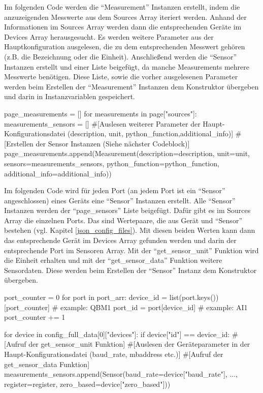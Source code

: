 Im folgenden Code werden die \enquote{Measurement} Instanzen erstellt, indem die anzuzeigenden Messwerte aus dem Sources Array iteriert werden. Anhand der Informationen im Sources Array werden dann die entsprechenden Geräte im Devices Array herausgesucht. Es werden weitere Parameter aus der Hauptkonfiguration ausgelesen, die zu dem entsprechenden Messwert gehören (z.B. die Bezeichnung oder die Einheit). Anschließend werden die \enquote{Sensor} Instanzen erstellt und einer Liste beigefügt, da manche Measurements mehrere Messwerte benötigen. Diese Liste, sowie die vorher ausgelesenen Parameter werden beim Erstellen der \enquote{Measurement} Instanzen dem Konstruktor übergeben und darin in Instanzvariablen gespeichert.
\begin{pythoncode}
page_measurements = []
for measurements in page["sources"]:
	measurements_sensors = []
	#[Auslesen weiterer Parameter der Haupt-Konfigurationsdatei (description, unit, python_function,additional_info)]
	#[Erstellen der Sensor Instanzen (Siehe nächster Codeblock)]
	page_measurements.append(Measurement(description=description, unit=unit, sensors=measurements_sensors, python_function=python_function, additional_info=additional_info))
\end{pythoncode}

Im folgenden Code wird für jeden Port (an jedem Port ist ein \enquote{Sensor} angeschlossen) eines Geräts eine \enquote{Sensor} Instanzen erstellt. Alle \enquote{Sensor} Instanzen werden der \enquote{page\_sensors} Liste beigefügt. Dafür gibt es im Sources Array die einzelnen Ports. Das sind Wertepaare, die aus Gerät und \enquote{Sensor} bestehen (vgl. Kapitel \ref{json_config_files}). Mit diesen beiden Werten kann dann das entsprechende Gerät im Devices Array gefunden werden und darin der entsprechende Port im Sensoren Array. Mit der \enquote{get\_sensor\_unit} Funktion wird die Einheit erhalten und mit der \enquote{get\_sensor\_data} Funktion weitere Sensordaten. Diese werden beim Erstellen der \enquote{Sensor} Instanz dem Konstruktor übergeben.
\begin{pythoncode}
port_counter = 0
for port in port_arr:
	device_id = list(port.keys())[port_counter] # example: QBM1
	port_id = port[device_id]  # example: AI1
	port_counter += 1
	
	for device in config_full_data[0]["devices"]:
		if device["id"] == device_id:
			#[Aufruf der get_sensor_unit Funktion]
			#[Auslesen der Geräteparameter in der Haupt-Konfigurationsdatei (baud_rate, mbaddress etc.)]
			#[Aufruf der get_sensor_data Funktion]
			measurements_sensors.append(Sensor(baud_rate=device["baud_rate"], ..., register=register, zero_based=device["zero_based"]))
\end{pythoncode}

